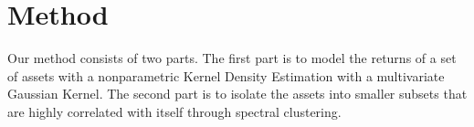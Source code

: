 \documentclass[10pt]{article}
\begin{document}

\section{Method}
Our method consists of two parts. The first part is to model the returns of a set of assets with a nonparametric Kernel Density Estimation with 
a multivariate Gaussian Kernel. The second part is to isolate the assets into smaller subsets that are highly correlated with itself through 
spectral clustering.
\end{document}
